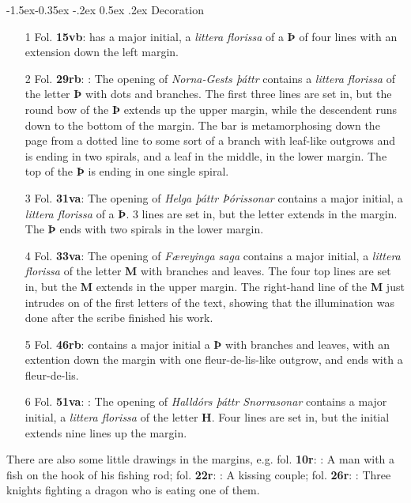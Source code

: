 \documentclass[11pt,twoside]{article}\makeatletter
\makeatletter
\renewcommand\subsubsection{\@startsection{subsubsection}{3}{\z@}%
     {-1.5ex\@plus -0.35ex \@minus -.2ex}%
     {0.5ex \@plus .2ex}%
     {\reset@font\large\sffamily}}
\makeatother
\begin{document}
\subsubsection{Decoration}
\par
\begin{itemize}

\item[1] Fol. \textbf{15vb}:  has a major initial, a \textit{littera florissa} of a \textbf{Þ} of four lines with an extension down the left margin.
\item[2] Fol. \textbf{29rb}: : The opening of \textit{Norna-Gests þáttr} contains a \textit{littera florissa} of the letter \textbf{Þ} with dots and branches. The first three lines are set in, but the round bow of the \textbf{Þ} extends up the upper margin, while the descendent runs down to the bottom of the margin. The bar is metamorphosing down the page from a dotted line to some sort of a branch with leaf-like outgrows and is ending in two spirals, and a leaf in the middle, in the lower margin. The top of the \textbf{Þ} is ending in one single spiral.
\item[3] Fol. \textbf{31va}: The opening of \textit{Helga þáttr Þórissonar} contains a major initial, a \textit{littera florissa} of a \textbf{Þ}. 3 lines are set in, but the letter extends in the margin. The \textbf{Þ} ends with two spirals in the lower margin.
\item[4] Fol. \textbf{33va}: The opening of \textit{Færeyinga saga} contains a major initial, a \textit{littera florissa} of the letter \textbf{M} with branches and leaves. The four top lines are set in, but the \textbf{M} extends in the upper margin. The right-hand line of the \textbf{M} just intrudes on of the first letters of the text, showing that the illumination was done after the scribe finished his work.
\item[5] Fol. \textbf{46rb}: contains a major initial a \textbf{Þ} with branches and leaves, with an extention down the margin with one fleur-de-lis-like outgrow, and ends with a fleur-de-lis.
\item[6] Fol. \textbf{51va}: : The opening of \textit{Halldórs þáttr Snorrasonar} contains a major initial, a \textit{littera florissa} of the letter \textbf{H}. Four lines are set in, but the initial extends nine lines up the margin.
\end{itemize}  \par
There are also some little drawings in the margins, e.g. fol. \textbf{10r}: : A man with a fish on the hook of his fishing rod; fol. \textbf{22r}: : A kissing couple; fol. \textbf{26r}: : Three knights fighting a dragon who is eating one of them.\par
\end{document}
